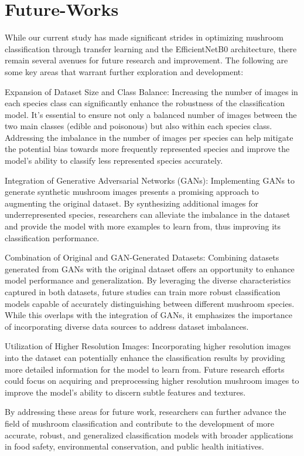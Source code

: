 \section{Future-Works}
While our current study has made significant strides in optimizing mushroom classification through transfer learning and the EfficientNetB0 architecture, there remain several avenues for future research and improvement. The following are some key areas that warrant further exploration and development:

Expansion of Dataset Size and Class Balance: Increasing the number of images in each species class can significantly enhance the robustness of the classification model. It's essential to ensure not only a balanced number of images between the two main classes (edible and poisonous) but also within each species class. Addressing the imbalance in the number of images per species can help mitigate the potential bias towards more frequently represented species and improve the model's ability to classify less represented species accurately.

Integration of Generative Adversarial Networks (GANs): Implementing GANs to generate synthetic mushroom images presents a promising approach to augmenting the original dataset. By synthesizing additional images for underrepresented species, researchers can alleviate the imbalance in the dataset and provide the model with more examples to learn from, thus improving its classification performance.

Combination of Original and GAN-Generated Datasets: Combining datasets generated from GANs with the original dataset offers an opportunity to enhance model performance and generalization. By leveraging the diverse characteristics captured in both datasets, future studies can train more robust classification models capable of accurately distinguishing between different mushroom species. While this overlaps with the integration of GANs, it emphasizes the importance of incorporating diverse data sources to address dataset imbalances.

Utilization of Higher Resolution Images: Incorporating higher resolution images into the dataset can potentially enhance the classification results by providing more detailed information for the model to learn from. Future research efforts could focus on acquiring and preprocessing higher resolution mushroom images to improve the model's ability to discern subtle features and textures.

By addressing these areas for future work, researchers can further advance the field of mushroom classification and contribute to the development of more accurate, robust, and generalized classification models with broader applications in food safety, environmental conservation, and public health initiatives.